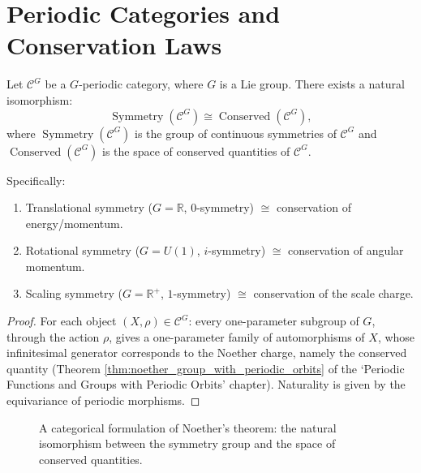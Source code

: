 \section{Periodic Categories and Conservation Laws}\label{sec:periodic_category_conservation_laws}

\begin{theorem}\label{thm:noether_categorical}
Let $\mathcal{C}^G$ be a $G$-periodic category, where $G$ is a Lie group. There exists a natural isomorphism:
\[
\operatorname{Symmetry}(\mathcal{C}^G) \cong \operatorname{Conserved}(\mathcal{C}^G),
\]
where $\operatorname{Symmetry}(\mathcal{C}^G)$ is the group of continuous symmetries of $\mathcal{C}^G$ and $\operatorname{Conserved}(\mathcal{C}^G)$ is the space of conserved quantities of $\mathcal{C}^G$.

Specifically:
\begin{enumerate}[label=(\roman*)]
    \item Translational symmetry ($G = \mathbb{R}$, $0$-symmetry) $\cong$ conservation of energy/momentum.
    \item Rotational symmetry ($G = U(1)$, $i$-symmetry) $\cong$ conservation of angular momentum.
    \item Scaling symmetry ($G = \mathbb{R}^+$, $1$-symmetry) $\cong$ conservation of the scale charge.
\end{enumerate}
\end{theorem}

\begin{proof}
For each object $(X, \rho) \in \mathcal{C}^G$: every one-parameter subgroup of $G$, through the action $\rho$, gives a one-parameter family of automorphisms of $X$, whose infinitesimal generator corresponds to the Noether charge, namely the conserved quantity (Theorem \ref{thm:noether_group_with_periodic_orbits} of the `Periodic Functions and Groups with Periodic Orbits' chapter). Naturality is given by the equivariance of periodic morphisms.
\end{proof}

\begin{figure}[htbp]
\centering
{}
\caption{A categorical formulation of Noether's theorem: the natural isomorphism between the symmetry group and the space of conserved quantities.}
\label{fig:noether_categorical}
\end{figure}

